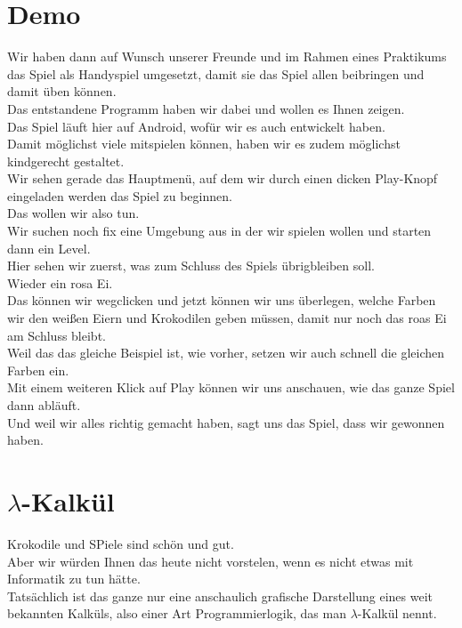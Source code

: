 \documentclass{scrartcl}
\begin{document}
	\section{Demo}
	Wir haben dann auf Wunsch unserer Freunde und im Rahmen eines Praktikums das Spiel als Handyspiel umgesetzt, damit sie das Spiel allen beibringen und damit üben können.\\
	Das entstandene Programm haben wir dabei und wollen es Ihnen zeigen.\\
	Das Spiel läuft hier auf Android, wofür wir es auch entwickelt haben.\\
	Damit möglichst viele mitspielen können, haben wir es zudem möglichst kindgerecht gestaltet.\\
	Wir sehen gerade das Hauptmenü, auf dem wir durch einen dicken Play-Knopf eingeladen werden das Spiel zu beginnen.\\
	Das wollen wir also tun.\\
	Wir suchen noch fix eine Umgebung aus in der wir spielen wollen und starten dann ein Level.\\
	Hier sehen wir zuerst, was zum Schluss des Spiels übrigbleiben soll.\\
	Wieder ein rosa Ei.\\
	Das können wir wegclicken und jetzt können wir uns überlegen, welche Farben wir den weißen Eiern und Krokodilen geben müssen, damit nur noch das roas Ei am Schluss bleibt.\\
	Weil das das gleiche Beispiel ist, wie vorher, setzen wir auch schnell die gleichen Farben ein.\\
	Mit einem weiteren Klick auf Play können wir uns anschauen, wie das ganze Spiel dann abläuft.\\
	Und weil wir alles richtig gemacht haben, sagt uns das Spiel, dass wir gewonnen haben.\\
	
	\section{$\lambda$-Kalkül}
	Krokodile und SPiele sind schön und gut.\\
	Aber wir würden Ihnen das heute nicht vorstelen, wenn es nicht etwas mit Informatik zu tun hätte.\\
	Tatsächlich ist das ganze nur eine anschaulich grafische Darstellung eines weit bekannten Kalküls, also einer Art Programmierlogik, das man $\lambda$-Kalkül nennt.
	
	
	
\end{document}
